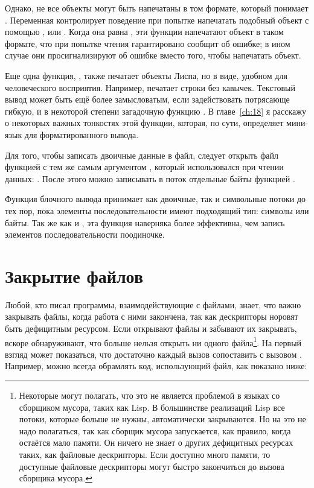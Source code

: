 Однако, не все объекты могут быть напечатаны в том формате, который понимает
. Переменная  контролирует поведение при попытке
напечатать подобный объект с помощью ,  или . Когда
она равна , эти функции напечатают объект в таком формате, что  при
попытке чтения гарантировано сообщит об ошибке; в ином случае они просигнализируют об
ошибке вместо того, чтобы напечатать объект.

Еще одна функция, , также печатает объекты Лиспа, но в виде, удобном для
человеческого восприятия. Например,  печатает строки без кавычек. Текстовый
вывод может быть ещё более замысловатым, если задействовать потрясающе гибкую, и в
некоторой степени загадочную функцию . В главе~\ref{ch:18} я расскажу о
некоторых важных тонкостях этой функции, которая, по сути, определяет мини-язык для
форматированного вывода.

Для того, чтобы записать двоичные данные в файл, следует открыть файл функцией 
с тем же самым аргументом , который использовался при чтении данных:
. После этого можно записывать в поток отдельные байты функцией
.

Функция блочного вывода  принимает как двоичные, так и символьные
потоки до тех пор, пока элементы последовательности имеют подходящий тип: символы или
байты. Так же как и , эта функция наверняка более эффективна, чем
запись элементов последовательности поодиночке.

\section{Закрытие файлов}

Любой, кто писал программы, взаимодействующие с файлами, знает, что важно закрывать файлы,
когда работа с ними закончена, так как дескрипторы норовят быть дефицитным ресурсом. Если
открывают файлы и забывают их закрывать, вскоре обнаруживают, что больше нельзя открыть ни
одного файла\footnote{Некоторые могут полагать, что это не является проблемой в языках со
  сборщиком мусора, таких как Lisp. В большинстве реализаций Lisp все потоки, которые
  больше не нужны, автоматически закрываются. Но на это не надо полагаться, так как
  сборщик мусора запускается, как правило, когда остаётся мало памяти. Он ничего не знает
  о других дефицитных ресурсах таких, как файловые дескрипторы. Если доступно много
  памяти, то доступные файловые дескрипторы могут быстро закончиться до вызова сборщика
  мусора.}. На первый взгляд может показаться, что достаточно каждый вызов 
сопоставить с вызовом . Например, можно всегда обрамлять код, использующий
файл, как показано ниже:

